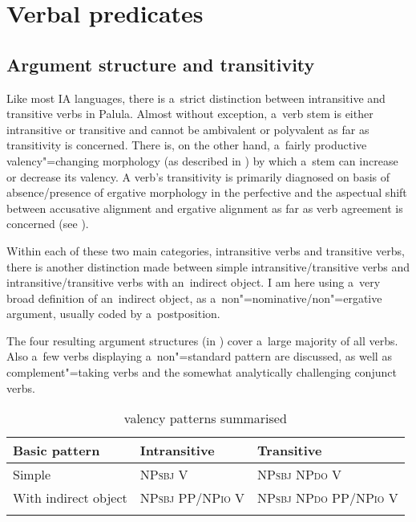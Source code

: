 \section{Verbal predicates}
\label{sec:12-2}

\subsection{Argument structure and transitivity}
\label{subsec:12-2-1}


Like most IA languages, there is a~strict distinction between intransitive and transitive verbs in Palula. Almost without exception, a~verb stem is either intransitive or transitive and cannot be ambivalent or polyvalent as far as transitivity is concerned. There is, on the other hand, a~fairly productive valency"=changing morphology (as described in ) by which a~stem can increase or decrease its valency. A verb's transitivity is primarily diagnosed on basis of absence/presence of ergative morphology in the perfective and the aspectual shift between accusative alignment and ergative alignment as far as verb agreement is concerned (see ). 


Within each of these two main categories, intransitive verbs and transitive verbs, there is another distinction made between simple intransitive/transitive verbs and intransitive/transitive verbs with an~indirect object. I am here using a~very broad definition of an~indirect object, as a~non"=nominative/non"=ergative argument, usually coded by a~postposition. 


The four resulting argument structures (in ) cover a~large majority of all verbs. Also a~few verbs displaying a~non"=standard pattern are discussed, as well as complement"=taking verbs and the somewhat analytically challenging conjunct verbs.


\begin{table}[ht]
\caption{valency patterns summarised}

\begin{tabularx}{\textwidth}{ Q Q Q }
\lsptoprule
Basic pattern &
Intransitive &
Transitive\\\hline
Simple &
NP\textsc{sbj} V &
NP\textsc{sbj} NP\textsc{do} V\\
With indirect object &
NP\textsc{sbj} PP/NP\textsc{io} V &
NP\textsc{sbj} NP\textsc{do} PP/NP\textsc{io} V\\\lspbottomrule
\end{tabularx}
\label{tab:12-2}
\end{table}


